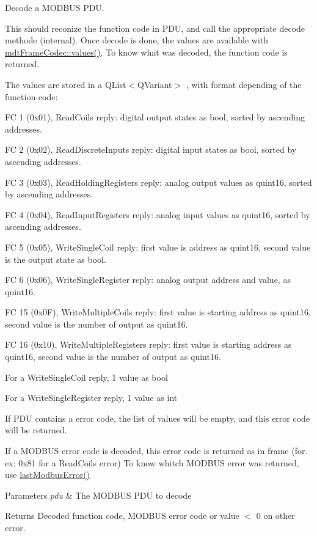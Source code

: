 Decode a MODBUS PDU. 

This should reconize the function code in PDU, and call the appropriate decode methode (internal). Once decode is done, the values are available with \hyperlink{classmdt_frame_codec_a2c0cc0f9d9b72ef2295b7ec7eca72ea7}{mdtFrameCodec::values()}. To know what was decoded, the function code is returned.

The values are stored in a QList$<$QVariant$>$ , with format depending of the function code:
\begin{DoxyItemize}
\item FC 1 (0x01), ReadCoils reply: digital output states as bool, sorted by ascending addresses.
\item FC 2 (0x02), ReadDiscreteInputs reply: digital input states as bool, sorted by ascending addresses.
\item FC 3 (0x03), ReadHoldingRegisters reply: analog output values as quint16, sorted by ascending addresses.
\item FC 4 (0x04), ReadInputRegisters reply: analog input values as quint16, sorted by ascending addresses.
\item FC 5 (0x05), WriteSingleCoil reply: first value is address as quint16, second value is the output state as bool.
\item FC 6 (0x06), WriteSingleRegister reply: analog output address and value, as quint16.
\item FC 15 (0x0F), WriteMultipleCoils reply: first value is starting address as quint16, second value is the number of output as quint16.
\item FC 16 (0x10), WriteMultipleRegisters reply: first value is starting address as quint16, second value is the number of output as quint16.
\item For a WriteSingleCoil reply, 1 value as bool
\item For a WriteSingleRegister reply, 1 value as int
\end{DoxyItemize}

If PDU contains a error code, the list of values will be empty, and this error code will be returned.

If a MODBUS error code is decoded, this error code is returned as in frame (for. ex: 0x81 for a ReadCoils error) To know whitch MODBUS error was returned, use \hyperlink{classmdt_frame_codec_modbus_a21f3102e12f1a1d9c4145c1ce1f8e6b6}{lastModbusError()}


\begin{DoxyParams}{Parameters}
{\em pdu} & The MODBUS PDU to decode \\
\hline
\end{DoxyParams}
\begin{DoxyReturn}{Returns}
Decoded function code, MODBUS error code or value $<$ 0 on other error. 
\end{DoxyReturn}


